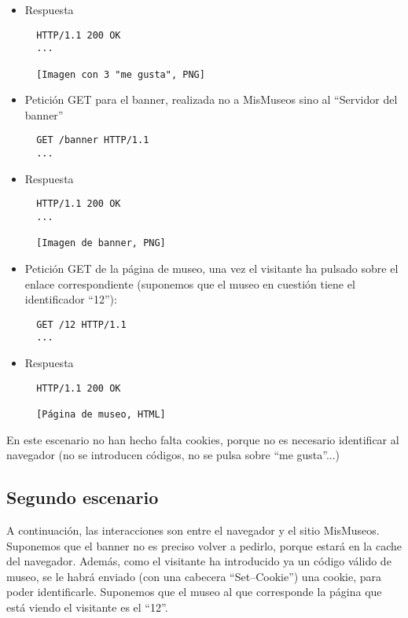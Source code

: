 {\begin{itemize}
\begin{verbatim}
  GET /iconos/3 HTTP/1.1
  ...
\end{verbatim}

\item Respuesta

\begin{verbatim}
  HTTP/1.1 200 OK
  ...

  [Imagen con 3 "me gusta", PNG]
\end{verbatim}


\item Petición GET para el banner, realizada no a MisMuseos sino al ``Servidor del banner''

\begin{verbatim}
  GET /banner HTTP/1.1
  ...
\end{verbatim}

\item Respuesta

\begin{verbatim}
  HTTP/1.1 200 OK
  ...

  [Imagen de banner, PNG]
\end{verbatim}
  

\item Petición GET de la página de museo, una vez el visitante ha pulsado sobre el enlace correspondiente (suponemos que el museo en cuestión tiene el identificador ``12''):

\begin{verbatim}
  GET /12 HTTP/1.1
  ...
\end{verbatim}

\item Respuesta

\begin{verbatim}
  HTTP/1.1 200 OK

  [Página de museo, HTML]
\end{verbatim}

\end{itemize}

En este escenario no han hecho falta cookies, porque no es necesario identificar al navegador (no se introducen códigos, no se pulsa sobre ``me gusta''...)


\subsection*{Segundo escenario}

A continuación, las interacciones son entre el navegador y el sitio MisMuseos. Suponemos que el banner no es preciso volver a pedirlo, porque estará en la cache del navegador. Además, como el visitante ha introducido ya un código válido de museo, se le habrá enviado (con una cabecera ``Set--Cookie'') una cookie, para poder identificarle. Suponemos que el museo al que corresponde la página que está viendo el visitante es el ``12''.

}
